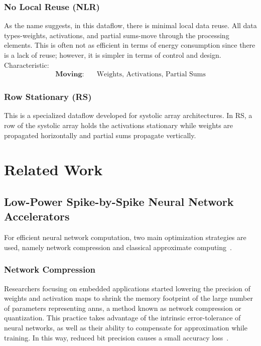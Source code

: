 \subsubsection{No Local Reuse (NLR)}
As the name suggests, in this dataflow, there is minimal local data reuse. All data types-weights, activations, and partial sums-move through the processing elements. This is often not as efficient in terms of energy consumption since there is a lack of reuse; however, it is simpler in terms of control and design. Characteristic:
\begin{align*}
\textbf{Moving:} & \quad \text{Weights, Activations, Partial Sums}
\end{align*}

\subsubsection{Row Stationary (RS)}
This is a specialized dataflow developed for systolic array architectures. In RS, a row of the systolic array holds the activations stationary while weights are propagated horizontally and partial sums propagate vertically.


\section{Related Work}
\subsection{Low-Power Spike-by-Spike Neural Network Accelerators}
For efficient neural network computation, two main optimization strategies are used, namely network compression and classical approximate computing~\cite{bouvier2019spiking}.

\subsubsection{Network Compression}
Researchers focusing on embedded applications started lowering the precision of weights and activation maps to shrink the memory footprint of the large number of parameters representing \glspl{ann}, a method known as network compression or quantization. This practice takes advantage of the intrinsic error-tolerance of neural networks, as well as their ability to compensate for approximation while training. In this way, reduced bit precision causes a small accuracy loss~\cite{courbariaux2015binaryconnect, han2015deep, hubara2017quantized, rastegari2016xnor}.


